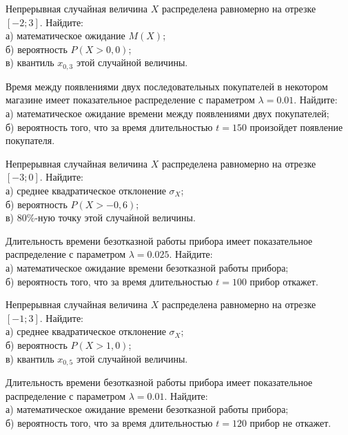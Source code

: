\vfill

\newpage\setcounter{zad}{0}

\z Непрерывная случайная величина $X$ распределена равномерно на отрезке $[-2; 3]$. Найдите: \\ \quad а) математическое ожидание $M(X)$; \\ \quad б) вероятность $P(X>0{,}0)$; \\ \quad в) квантиль $x_{0{,}3}$ этой случайной величины.


\vfill

\z Время между появлениями двух последовательных покупателей в некотором магазине имеет показательное распределение с параметром $\lambda = 0.01$. Найдите: \\ \quad а) математическое ожидание времени между появлениями двух покупателей; \\ \quad б) вероятность того, что за время длительностью $t = 150$  произойдет появление покупателя.
 

\vfill

\newpage\setcounter{zad}{0}

\z Непрерывная случайная величина $X$ распределена равномерно на отрезке $[-3; 0]$. Найдите: \\ \quad а) среднее квадратическое отклонение $\sigma_X$; \\ \quad б) вероятность $P(X>-0{,}6)$; \\ \quad в) $80\%$-ную точку этой случайной величины.


\vfill

\z Длительность времени безотказной работы прибора имеет показательное распределение с параметром $\lambda = 0.025$. Найдите: \\ \quad а) математическое ожидание времени безотказной работы прибора; \\ \quad б) вероятность того, что за время длительностью $t = 100$ прибор  откажет.
 

\vfill

\newpage\setcounter{zad}{0}

\z Непрерывная случайная величина $X$ распределена равномерно на отрезке $[-1; 3]$. Найдите: \\ \quad а) среднее квадратическое отклонение $\sigma_X$; \\ \quad б) вероятность $P(X>1{,}0)$; \\ \quad в) квантиль $x_{0{,}5}$ этой случайной величины.


\vfill

\z Длительность времени безотказной работы прибора имеет показательное распределение с параметром $\lambda = 0.01$. Найдите: \\ \quad а) математическое ожидание времени безотказной работы прибора; \\ \quad б) вероятность того, что за время длительностью $t = 120$ прибор не откажет.
 

